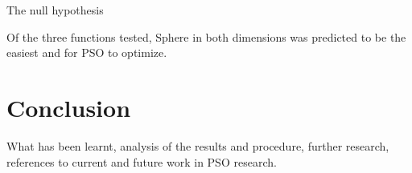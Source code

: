 \documentclass{csfourzero}
\begin{document}
The null hypothesis 


Of the three functions tested, Sphere in both dimensions was predicted to be the
easiest and for PSO to optimize. %



\section{Conclusion}

What has been learnt, analysis of the results and procedure, further research,
references to current and future work in PSO research.


\end{document}
